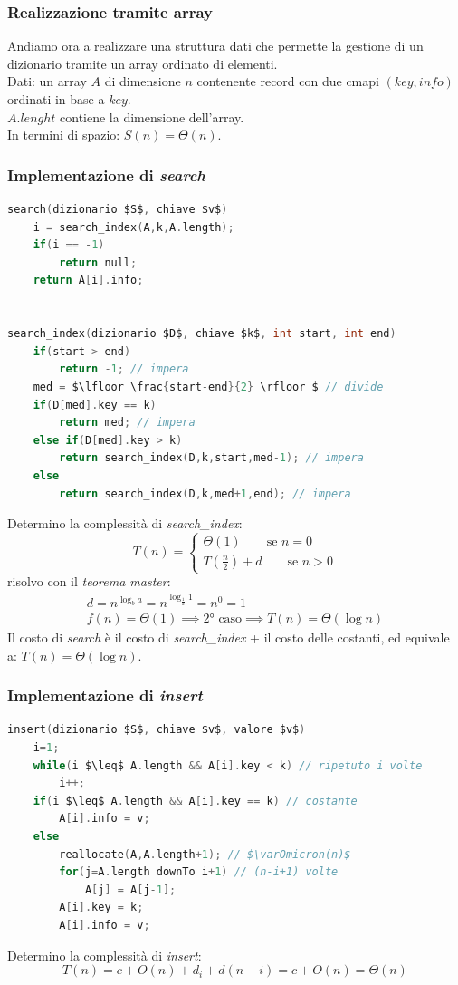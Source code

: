 \documentclass[italian]{article}
\newcommand{\varOmicron}{O}
\newcommand{\fn}{f(n)}
\begin{document}
\subsubsection{Realizzazione tramite array}
Andiamo ora a realizzare una struttura dati che permette la gestione di un dizionario tramite un array ordinato di elementi.\\
Dati: un array $A$ di dimensione $n$ contenente record con due cmapi $(key,info)$ ordinati in base a $key$. \\
$A.lenght$ contiene la dimensione dell'array.\\
In termini di spazio: $S(n) = \varTheta(n)$.
\subsubsection{Implementazione di \textit{search}}
\begin{lstlisting}[language=c,mathescape=true]
search(dizionario $S$, chiave $v$)
	i = search_index(A,k,A.length);
	if(i == -1)
		return null;
	return A[i].info;
	
	
search_index(dizionario $D$, chiave $k$, int start, int end)
	if(start > end)
		return -1; // impera
	med = $\lfloor \frac{start-end}{2} \rfloor $ // divide
	if(D[med].key == k)
		return med; // impera
	else if(D[med].key > k)
		return search_index(D,k,start,med-1); // impera
	else
		return search_index(D,k,med+1,end); // impera
\end{lstlisting}
Determino la complessità di \textit{search\_index}:
\[
	T(n) =
	\begin{cases*}
		\varTheta(1) \qquad \text{se } n=0 \\
		T(\frac{n}{2}) + d \qquad \text{se } n>0
	\end{cases*}
\]
risolvo con il \textit{teorema master}:
\begin{gather*}
	d = n^{\log_b a} = n^{\log_{\frac{1}{2}}1} = n^0 = 1 \\
	\fn = \varTheta(1) \implies \text{2° caso} \implies T(n) = \varTheta(\log n)
\end{gather*}
Il costo di \textit{search} è il costo di \textit{search\_index} + il costo delle costanti, ed equivale a: $T(n) = \varTheta(\log n)$.
\pagebreak
\subsubsection{Implementazione di \textit{insert}}
\begin{lstlisting}[language=c,mathescape=true]
insert(dizionario $S$, chiave $v$, valore $v$)
	i=1;
	while(i $\leq$ A.length && A[i].key < k) // ripetuto i volte
		i++;	
	if(i $\leq$ A.length && A[i].key == k) // costante
		A[i].info = v;
	else
		reallocate(A,A.length+1); // $\varOmicron(n)$
		for(j=A.length downTo i+1) // (n-i+1) volte
			A[j] = A[j-1];
		A[i].key = k;
		A[i].info = v;
\end{lstlisting}
Determino la complessità di \textit{insert}:
\[
	T(n) = c + \varOmicron(n) + d_i + d(n-i) = c + \varOmicron(n) = \varTheta(n)
\]
\end{document}
